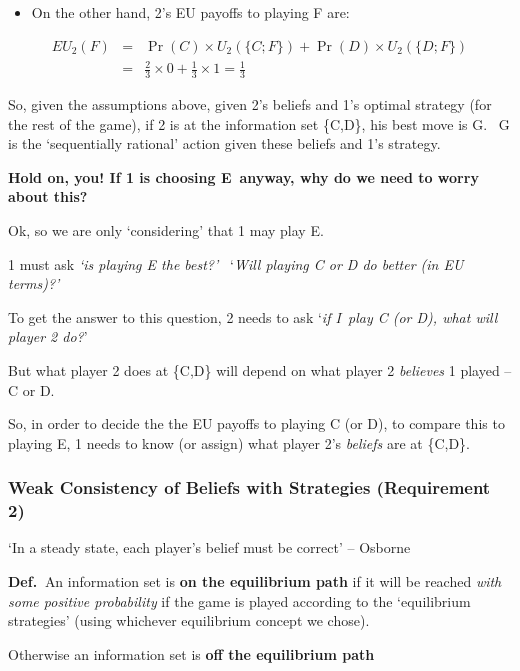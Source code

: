 \documentclass{article}
\begin{document}
\begin{itemize}
\item On the other hand, 2's EU payoffs to playing F are:
\end{itemize}

\begin{eqnarray*}
EU_{2}(F) &=&\Pr (C)\times U_{2}(\{C;F\})+\Pr (D)\times U_{2}(\{D;F\}) \\
&=&\frac{2}{3}\times 0+\frac{1}{3}\times 1=\frac{1}{3}
\end{eqnarray*}

So, given the assumptions above, given 2's beliefs and 1's optimal strategy
(for the rest of the game), if 2 is at the information set \{C,D\}, his best
move is G. \ G is the `sequentially rational' action given these beliefs and
1's strategy.

\bigskip

\textbf{Hold on, you! If 1 is choosing E\ anyway, why do we need to worry
about this?}

Ok, so we are only `considering' that 1 may play E. \ 

1 must ask \textit{`is playing E the best?'} \ `\textit{Will playing C or D
do better (in EU terms)?'}

To get the answer to this question, 2 needs to ask `\textit{if I\ play C (or
D), what will player 2 do?}'

But what player 2 does at \{C,D\} will depend on what player 2 \textit{%
believes }1 played -- C or D.

So, in order to decide the the EU payoffs to playing C (or D), to compare
this to playing E, 1 needs to know (or assign) what player 2's \textit{%
beliefs }are at \{C,D\}.

\pagebreak \bigskip

\subsubsection{Weak Consistency of Beliefs with Strategies (Requirement 2)}

`In a steady state, each player's belief must be correct' -- Osborne

\textbf{Def. }$\ $An information set is \textbf{on the equilibrium path }if
it will be reached \textit{with some positive probability} if the game is
played according to the `equilibrium strategies' (using whichever
equilibrium concept we chose).

Otherwise an information set is \textbf{off the equilibrium path}
\end{document}
